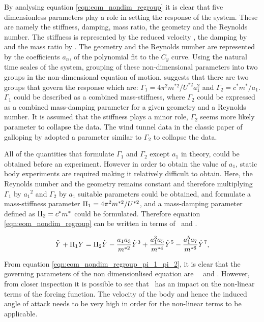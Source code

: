 By analysing equation \ref{eqn:eom_nondim_regroup} it is clear that five dimensionless parameters play a role in setting the response of the system. These are namely the stiffness, damping, mass ratio, the geometry and the Reynolds number. The stiffness is represented by the reduced velocity \ustar, the damping by \cstar and the mass ratio by \mstar. The geometry and the Reynolds number are represented by the coefficients $a_n$, of the polynomial fit to the $C_y$ curve. Using the natural time scales of the system, grouping of these non-dimensional parameters into two groups in the non-dimensional equation of motion, suggests that there are two groups that govern the response which are: $\Gamma_1 = 4\pi^2m^{*2}/U^{*2}a_1^2$ and $\Gamma_2 = c^*m^*/a_1$. $\Gamma_1$ could be described as a combined mass-stiffness, where $\Gamma_2$ could be expressed as a combined mass-damping parameter for a given geometry and a Reynolds number. It is assumed that the stiffness plays a minor role, $\Gamma_2$ seems more likely parameter to collapse the data. The wind tunnel data in the classic paper of galloping by \citet{Parkinson1964} adopted a parameter similar to $\Gamma_2$ to collapse the data. 

All of the quantities that formulate $\Gamma_1$ and $\Gamma_2$ except $a_1$ in theory, could be obtained before an experiment. However in order to obtain the value of $a_1$, static body experiments are required making it relatively difficult to obtain. Here, the Reynolds number and the geometry remains constant and therefore multiplying $\Gamma_1$ by ${a_1}^2$ and $\Gamma_2$ by $a_1$ suitable parameters could be obtained, and formulate a mass-stiffness parameter $\Pi_1 =  4\pi^2m^{*2}/U^{*2}$, and a mass-damping parameter defined as $\Pi_2 = c^*m^*$ could be formulated. Therefore equation \ref{eqn:eom_nondim_regroup} can be written in terms of \massstiff \ and \massdamp. 

\begin{equation}
	\label{eqn:eom_nondim_regroup_pi_1_pi_2}
	\ddot{Y} + \Pi_1 Y = \Pi_2 \dot{Y} - \frac{a_1a_3}{m^{*2}}\dot{Y}^3 + \frac{a_1^3a_5}{m^{*4}}\dot{Y}^5 - \frac{a_1^5a_7}{m^{*6}}\dot{Y}^7,
\end{equation} 

From equation \ref{eqn:eom_nondim_regroup_pi_1_pi_2}, it is clear that the governing parameters of the non dimensionlised equation are \massstiff \ \massdamp\ and \mstar. However, from closer inspection it is possible to see that \mstar\ has an impact on the non-linear terms of the forcing function. The velocity of the body and hence the induced angle of attack needs to be very high in order for the non-linear terms to be applicable. 









